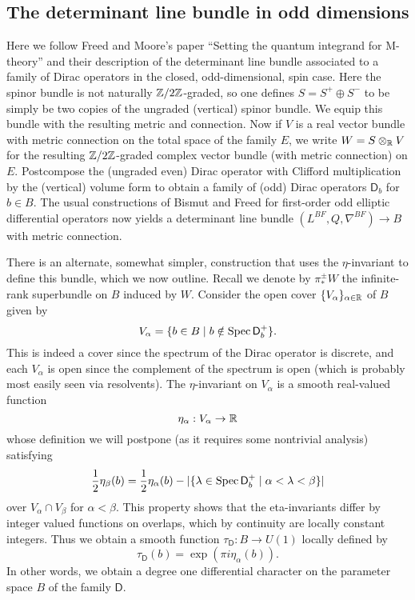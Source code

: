 \documentclass{amsart}
\begin{document}
\subsection{The determinant line bundle in odd dimensions}

Here we follow Freed and Moore's paper ``Setting the quantum integrand for M-theory''
and their description of the determinant line bundle associated to a family
of Dirac operators in the closed, odd-dimensional, spin case. Here the
spinor bundle is not naturally $\mathbb{Z}/2\mathbb{Z}$-graded, so one defines $S=S^+\oplus S^-$
to be simply be two copies of the ungraded (vertical) spinor bundle. We equip this bundle
with the resulting metric and connection. Now if $V$ is a real vector bundle
with metric connection on the total space of the family $E$, we write
$W=S\otimes_{\mathbb{R}} V$ for the resulting $\mathbb{Z}/2\mathbb{Z}$-graded complex vector bundle
(with metric connection) on $E$. Postcompose the (ungraded even) Dirac operator 
with Clifford multiplication by the (vertical) volume form to obtain a family of (odd) Dirac
operators $\mathsf{D}_b$ for $b\in B$. The usual constructions of Bismut and
Freed for first-order odd elliptic differential operators now yields a determinant
line bundle $(L^{BF}, Q, \nabla^{BF})\to B$ with metric connection.

There is an alternate, somewhat simpler, construction that uses the $\eta$-invariant
to define this bundle, which we now outline. Recall we denote by $\pi_*^\pm W$ the
infinite-rank superbundle on $B$ induced by $W$.  Consider the open cover
$\{V_\alpha\}_{\alpha\in\mathbb{R}}$ of $B$ given by
\begin{equation*}
    V_\alpha = \{ b\in B \mid b\notin \operatorname{Spec} \mathsf{D}_b^+ \}.
\end{equation*}
This is indeed a cover since the spectrum of the Dirac operator is discrete, and
each $V_\alpha$ is open since the complement of the spectrum is open (which is
probably most easily seen via resolvents). The $\eta$-invariant on $V_\alpha$
is a smooth real-valued function
\begin{equation*}
    \eta_\alpha: V_\alpha \to \mathbb{R}
\end{equation*}
whose definition we will postpone (as it requires some nontrivial analysis) satisfying
\begin{equation*}
    \frac{1}{2}\eta_\beta(b) = \frac{1}{2}\eta_\alpha(b) - |\{\lambda\in\operatorname{Spec} \mathsf{D}_b^+ \mid \alpha < \lambda < \beta\}|
\end{equation*}
over $V_\alpha\cap V_\beta$ for $\alpha<\beta$. This property shows that the
eta-invariants differ by integer valued functions on overlaps, which by
continuity are locally constant integers. Thus we obtain a smooth
function $\tau_{\mathsf{D}}:B\to U(1)$ locally defined by
\begin{equation*}
    \tau_{\mathsf{D}}(b) = \exp(\pi i \eta_\alpha(b)).
\end{equation*}
In other words, we obtain a degree one differential character on the parameter
space $B$ of the family $\mathsf{D}$.
\end{document}
